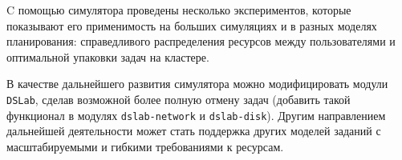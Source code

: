 C помощью симулятора проведены несколько экспериментов, которые показывают его применимость на больших симуляциях и в разных моделях планирования: справедливого распределения ресурсов между пользователями и  оптимальной упаковки задач на кластере. 


В качестве дальнейшего развития симулятора можно модифицировать модули \texttt{DSLab}, сделав возможной более полную отмену задач (добавить такой функционал в модулях \texttt{dslab-network} и \texttt{dslab-disk}). Другим направлением дальнейшей деятельности может стать поддержка других моделей заданий с масштабируемыми и гибкими требованиями к ресурсам.


